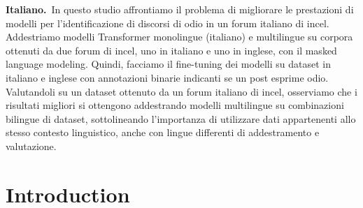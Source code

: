 \documentclass[11pt]{article}
\begin{document}
\begin{abstract-alt}
\textrm{\bf{Italiano.}}~In questo studio affrontiamo il problema di migliorare le prestazioni di modelli per l'identificazione di discorsi di odio in un forum italiano di incel.
Addestriamo modelli Transformer monolingue (italiano) e multilingue su corpora ottenuti da due forum di incel, uno in italiano e uno in inglese, con il masked language modeling. Quindi, facciamo il fine-tuning dei modelli su dataset in italiano e inglese con annotazioni binarie indicanti se un post esprime odio.
Valutandoli su un dataset ottenuto da un forum italiano di incel, osserviamo che i risultati migliori si ottengono addestrando modelli multilingue su combinazioni bilingue di dataset, sottolineando l'importanza di utilizzare dati appartenenti allo stesso contesto linguistico, anche con lingue differenti di addestramento e valutazione.
 
\end{abstract-alt}


\section{Introduction}
\end{document}
